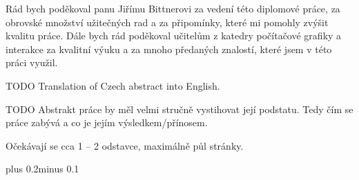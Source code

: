 \documentclass[11pt,twoside,a4paper]{book}
\begin{document}
\coverpagestarts

\acknowledgements
\noindent
Rád bych poděkoval panu Jiřímu Bittnerovi za vedení této diplomové práce, za obrovské množství užitečných rad a za připomínky, které mi pomohly zvýšit kvalitu práce. Dále bych rád poděkoval učitelům z katedry počítačové grafiky a interakce za kvalitní výuku a za mnoho předaných znalostí, které jsem v této práci využil.




\abstractpage
TODO
Translation of Czech abstract into English.


\baselineskip

TODO
\noindent
Abstrakt práce by měl velmi stručně vystihovat její podstatu. Tedy čím se práce zabývá a co je jejím výsledkem/přínosem.

\noindent
Očekávají se cca 1 -- 2 odstavce, maximálně půl stránky.

\tableofcontents


\listoffigures


\listoftables


\mainbodystarts
\normalfont
{}\baselineskip plus 0.2\baselineskip minus 0.1\baselineskip



% 
% 
\end{document}
